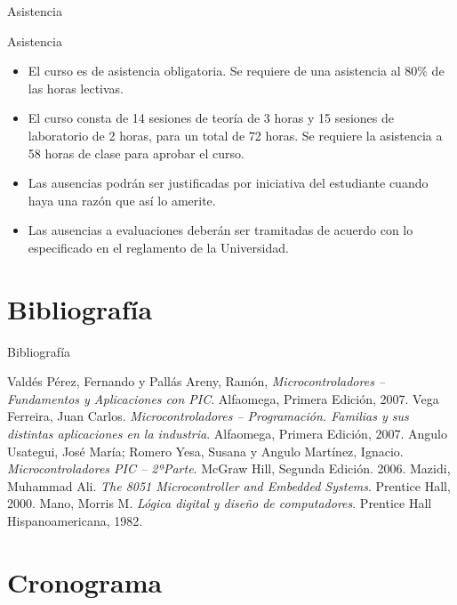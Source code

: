 \documentclass[xcolor=dvipsnames]{beamer}
\newcommand{\pageframe}[1]{\frame{\begin{center}{ \Huge #1 }\end{center}}}
\begin{document}
\begin{frame}{Asistencia}
\begin{block}{Asistencia}
  \begin{itemize}[<+->]
    \item El curso es de asistencia obligatoria. Se requiere de una asistencia al 80\% de las horas lectivas.
    \item El curso consta de 14 sesiones de teoría de 3 horas y 15 sesiones de laboratorio de 2 horas, para un total de 72 horas. Se requiere la asistencia a 58 horas de clase para aprobar el curso.
    \item Las ausencias podrán ser justificadas por iniciativa del estudiante cuando haya una razón que así lo amerite.
    \item Las ausencias a evaluaciones deberán ser tramitadas de acuerdo con lo especificado en el reglamento de la Universidad.
  \end{itemize}
\end{block}
\end{frame}

\section{Bibliografía}

\pageframe{Bibliografía}
\nocite{*}

\begin{frame}{Bibliografía}

\begin{thebibliography}{5}
  Valdés Pérez, Fernando y Pallás Areny, Ramón,
  \textit{Microcontroladores -- Fundamentos y Aplicaciones con PIC}.
  Alfaomega,
  Primera Edición,
  2007.
  Vega Ferreira, Juan Carlos.
  \textit{Microcontroladores -- Programación. Familias y sus distintas aplicaciones en la industria}.
  Alfaomega,
  Primera Edición,
  2007.
  Angulo Usategui, José María; Romero Yesa, Susana y Angulo Martínez, Ignacio.
  \textit{Microcontroladores PIC -- 2ªParte}.
  McGraw Hill,
  Segunda Edición.
  2006.
  Mazidi, Muhammad Ali.
  \textit{The 8051 Microcontroller and Embedded Systems}.
  Prentice Hall,
  2000.
  Mano, Morris M.
  \textit{Lógica digital y diseño de computadores}.
  Prentice Hall Hispanoamericana,
  1982.
\end{thebibliography}

\end{frame}

\section{Cronograma}
\end{document}
